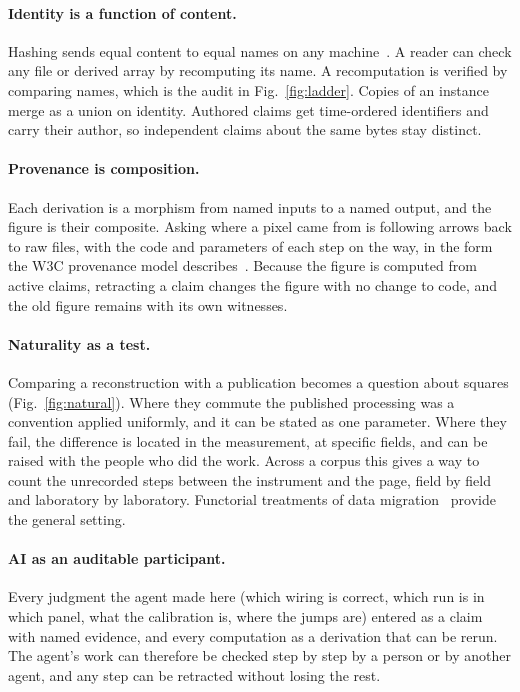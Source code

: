 \documentclass[11pt]{article}
\begin{document}
\paragraph{Identity is a function of content.} Hashing sends equal content to equal names on any machine~\cite{Benet2014-ipfs}. A reader can check any file or derived array by recomputing its name. A recomputation is verified by comparing names, which is the audit in Fig.~\ref{fig:ladder}. Copies of an instance merge as a union on identity. Authored claims get time-ordered identifiers and carry their author, so independent claims about the same bytes stay distinct.

\paragraph{Provenance is composition.} Each derivation is a morphism from named inputs to a named output, and the figure is their composite. Asking where a pixel came from is following arrows back to raw files, with the code and parameters of each step on the way, in the form the W3C provenance model describes~\cite{Moreau2013-provdm}. Because the figure is computed from active claims, retracting a claim changes the figure with no change to code, and the old figure remains with its own witnesses.

\paragraph{Naturality as a test.} Comparing a reconstruction with a publication becomes a question about squares (Fig.~\ref{fig:natural}). Where they commute the published processing was a convention applied uniformly, and it can be stated as one parameter. Where they fail, the difference is located in the measurement, at specific fields, and can be raised with the people who did the work. Across a corpus this gives a way to count the unrecorded steps between the instrument and the page, field by field and laboratory by laboratory. Functorial treatments of data migration~\cite{Spivak2012-fdm,Fong2019-sevensketches} provide the general setting.

\paragraph{AI as an auditable participant.} Every judgment the agent made here (which wiring is correct, which run is in which panel, what the calibration is, where the jumps are) entered as a claim with named evidence, and every computation as a derivation that can be rerun. The agent's work can therefore be checked step by step by a person or by another agent, and any step can be retracted without losing the rest.
\end{document}
